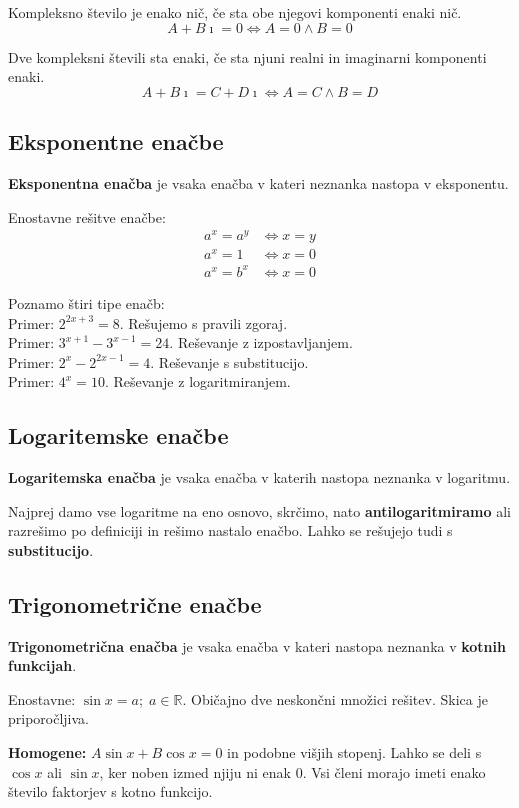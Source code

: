 \documentclass[a4paper,oneside,12pt,fleqn]{article}
\def\R{\ensuremath{\mathbb R}}
\newcommand{\ii}{\ensuremath{\imath}}
\def\kos{\cos}
\renewcommand\iff\Leftrightarrow
\numberwithin{equation}{section}
\begin{document}
Kompleksno število je enako nič, če sta obe njegovi komponenti enaki nič.
\[ A + B\ii = 0 \iff A = 0 \land B = 0 \]

Dve kompleksni števili sta enaki, če sta njuni realni in imaginarni komponenti enaki.
\[ A + B\ii = C + D\ii \iff A = C \land B = D \]

\subsection{Eksponentne enačbe}
\label{sec:enac:eks}
\textbf{Eksponentna enačba} je vsaka enačba v kateri neznanka nastopa v eksponentu.

Enostavne rešitve enačbe:
\begin{align*}
  a^x = a^y &\iff x = y \\
  a^x = 1 &\iff x = 0 \\
  a^x = b^x &\iff x = 0
\end{align*}

Poznamo štiri tipe enačb: \\
Primer: $2^{2x+3} = 8$. Rešujemo s pravili zgoraj.\\
Primer: $3^{x+1} - 3^{x-1} = 24$. Reševanje z izpostavljanjem.\\
Primer: $2^x - 2^{2x-1} = 4$. Reševanje s substitucijo.\\
Primer: $4^x = 10$. Reševanje z logaritmiranjem.

\subsection{Logaritemske enačbe}
\label{sec:enac:log}
\textbf{Logaritemska enačba} je vsaka enačba v katerih nastopa neznanka v logaritmu.

Najprej damo vse logaritme na eno osnovo, skrčimo, nato \textbf{antilogaritmiramo} ali razrešimo po
definiciji in rešimo nastalo enačbo. Lahko se rešujejo tudi s \textbf{substitucijo}.

\subsection{Trigonometrične enačbe}
\label{sec:enac:trig}
\textbf{Trigonometrična enačba} je vsaka enačba v kateri nastopa neznanka v \textbf{kotnih funkcijah}.

Enostavne: $\sin x = a; \; a \in \R$. Običajno dve neskončni množici rešitev. Skica je
priporočljiva.

\textbf{Homogene:} $A\sin x + B\kos x = 0$ in podobne višjih stopenj. Lahko se deli s $\kos x$ ali
$\sin x$, ker noben izmed njiju ni enak 0. Vsi členi morajo imeti enako število faktorjev
s kotno funkcijo.
\end{document}
